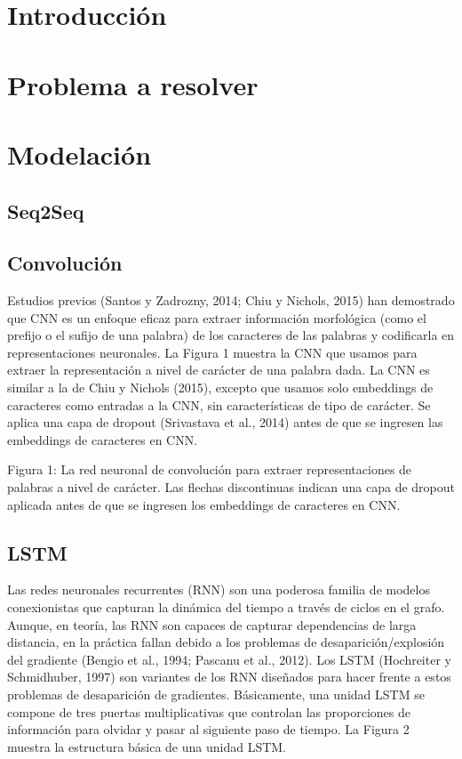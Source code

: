 \documentclass[runningheads]{llncs}
\begin{document}
\section{Introducción}

\section{Problema a resolver}

\section{Modelación}

\subsection{Seq2Seq}

\subsection{Convolución}
Estudios previos (Santos y Zadrozny, 2014; Chiu y Nichols, 2015) han demostrado que CNN es un enfoque eficaz para extraer información morfológica (como el prefijo o el sufijo de una palabra) de los caracteres de las palabras y codificarla en representaciones neuronales. La Figura 1 muestra la CNN que usamos para extraer la representación a nivel de carácter de una palabra dada. La CNN es similar a la de Chiu y Nichols (2015), excepto que usamos solo embeddings de caracteres como entradas a la CNN, sin características de tipo de carácter. Se aplica una capa de dropout (Srivastava et al., 2014) antes de que se ingresen las embeddings de caracteres en CNN.

Figura 1: La red neuronal de convolución para extraer representaciones de palabras a nivel de carácter. Las flechas discontinuas indican una capa de dropout aplicada antes de que se ingresen los embeddings de caracteres en CNN.


\subsection{LSTM}
	
Las redes neuronales recurrentes (RNN) son una poderosa familia de modelos conexionistas que capturan la dinámica del tiempo a través de ciclos en el grafo. Aunque, en teoría, las RNN son capaces de capturar dependencias de larga distancia, en la práctica fallan debido a los problemas de desaparición/explosión del gradiente (Bengio et al., 1994; Pascanu et al., 2012). Los LSTM (Hochreiter y Schmidhuber, 1997) son variantes de los RNN diseñados para hacer frente a estos problemas de desaparición de gradientes. Básicamente, una unidad LSTM se compone de tres puertas multiplicativas que controlan las proporciones de información para olvidar y pasar al siguiente paso de tiempo. La Figura 2 muestra la estructura básica de una unidad LSTM.
\end{document}
